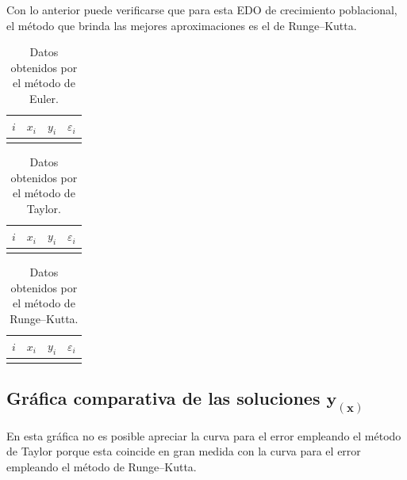 \documentclass[
    english, spanish, Ce-table, Ce-theorem
]{CabesHW}
\begin{document}
Con lo anterior puede verificarse que para esta EDO de crecimiento poblacional, el método que brinda las mejores aproximaciones es el de Runge--Kutta.

\begin{center}
\begin{minipage}{.45\textwidth}
\begin{table}[H]
    \centering
    \begin{tabular}{c|ccc}
    $i$ & $x_i$ & $y_i$ & $\varepsilon_i$\\[.1em]
    \hline\\[-.9em]
    
    \end{tabular}
    \caption{Datos obtenidos por el método de Euler.}
    \label{tab:euler}
\end{table}
\end{minipage}
\hfill
\begin{minipage}{.45\textwidth}
\begin{table}[H]
    \centering
    \begin{tabular}{c|ccc}
    $i$ & $x_i$ & $y_i$ & $\varepsilon_i$\\[.1em]
    \hline\\[-.9em]
    
    \end{tabular}
    \caption{Datos obtenidos por el método de Taylor.}
    \label{tab:taylor}
\end{table}
\end{minipage}
\end{center}

\vspace{1em}

\begin{table}[H]
    \centering
    \begin{tabular}{c|ccc}
    $i$ & $x_i$ & $y_i$ & $\varepsilon_i$\\[.1em]
    \hline\\[-.9em]
    
    \end{tabular}
    \caption{Datos obtenidos por el método de Runge--Kutta.}
    \label{tab:runge-kutta}
\end{table}

\vspace{0.5em}
\subsection[Gráfica comparativa de las soluciones]{Gráfica comparativa de las soluciones $\boldsymbol{y_{(x)}}$}
En esta gráfica no es posible apreciar la curva para el error empleando el método de Taylor porque esta coincide en gran medida con la curva para el error empleando el método de Runge--Kutta.
\end{document}
